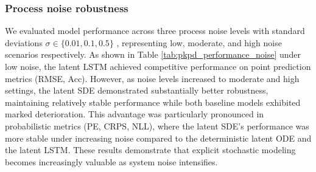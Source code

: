 \documentclass[preprint,12pt]{elsarticle}
\begin{document}
\subsubsection{Process noise robustness}
We evaluated model performance across three process noise levels with standard deviations $\sigma \in \{0.01, 0.1, 0.5\}$ , representing low, moderate, and high noise scenarios respectively. As shown in Table \ref{tab:pkpd_performance_noise} under low noise, the latent LSTM achieved competitive performance on point prediction metrics (RMSE, Acc). However, as noise levels increased to moderate and high settings, the latent SDE demonstrated substantially better robustness, maintaining relatively stable performance while both baseline models exhibited marked deterioration. This advantage was particularly pronounced in probabilistic metrics (PE, CRPS, NLL), where the latent SDE's performance was more stable under increasing noise compared to the deterministic latent ODE and the latent LSTM. These results demonstrate that explicit stochastic modeling becomes increasingly valuable as system noise intensifies.
\end{document}
